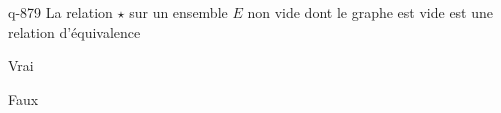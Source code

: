 \begin{truefalse}{q-879}
La relation $\star$ sur un ensemble $E$ non vide dont le graphe est vide est une relation d'équivalence
\item Vrai
\item* Faux
\end{truefalse}


